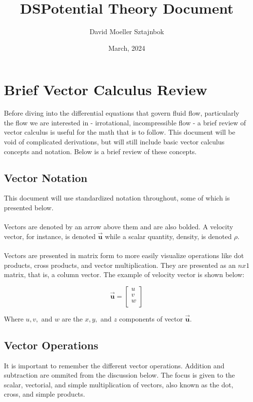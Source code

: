 \documentclass[11pt]{article}
\title{DSPotential Theory Document}
\author{ David Moeller Sztajnbok }
\date{March, 2024}
\begin{document}
\maketitle


\section{Brief Vector Calculus Review}
Before diving into the differential equations that govern fluid flow, particularly the flow we are interested in - irrotational, incompressible flow - a brief review of vector calculus is useful for the math that is to follow. This document will be void of complicated derivations, but will still include basic vector calculus concepts and notation. Below is a brief review of these concepts. \\
\subsection{Vector Notation}
This document will use standardized notation throughout, some of which is presented below.\\ \\
\noindent
Vectors are denoted by an arrow above them and are also bolded. A velocity vector, for instance, is denoted $\vec{\bm{u}}$ while a scalar quantity, density, is denoted $\rho$.\\ \\
\noindent
Vectors are presented in matrix form to more easily visualize operations like dot products, cross products, and vector multiplication. They are presented as an $nx1$ matrix, that is, a column vector. The example of velocity vector is shown below:

\begin{equation*}
    \vec{\bm{u}} = \begin{bmatrix}
                    u \\
                    v \\
                    w \\
                    \end{bmatrix}
\end{equation*}

\noindent
Where $u, v, $ and $w$ are the $x, y, $ and $z$ components of vector $\vec{\bm{u}}$. \\

\subsection{Vector Operations}
It is important to remember the different vector operations. Addition and subtraction are ommited from the discussion below. The focus is given to the scalar, vectorial, and simple multiplication of vectors, also known as the dot, cross, and simple products. 
\end{document}
